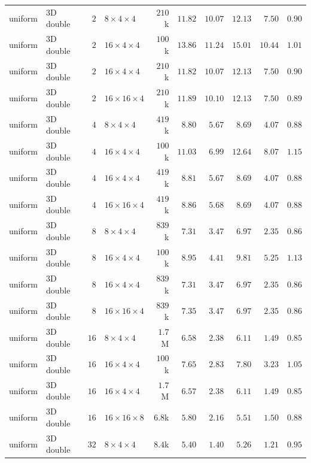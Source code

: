 {\begin{longtable}{llrlrrrrrr}
    uniform & 3D double & $2$ & $8{\times}4{\times}4$ & $210$k & $11.82$ & $10.07$ & $12.13$ & $7.50$ & $0.90$ \\
    uniform & 3D double & $2$ & $16{\times}4{\times}4$ & $100$k & $13.86$ & $11.24$ & $15.01$ & $10.44$ & $1.01$ \\
    uniform & 3D double & $2$ & $16{\times}4{\times}4$ & $210$k & $11.82$ & $10.07$ & $12.13$ & $7.50$ & $0.90$ \\
    uniform & 3D double & $2$ & $16{\times}16{\times}4$ & $210$k & $11.89$ & $10.10$ & $12.13$ & $7.50$ & $0.89$ \\
    uniform & 3D double & $4$ & $8{\times}4{\times}4$ & $419$k & $8.80$ & $5.67$ & $8.69$ & $4.07$ & $0.88$ \\
    uniform & 3D double & $4$ & $16{\times}4{\times}4$ & $100$k & $11.03$ & $6.99$ & $12.64$ & $8.07$ & $1.15$ \\
    uniform & 3D double & $4$ & $16{\times}4{\times}4$ & $419$k & $8.81$ & $5.67$ & $8.69$ & $4.07$ & $0.88$ \\
    uniform & 3D double & $4$ & $16{\times}16{\times}4$ & $419$k & $8.86$ & $5.68$ & $8.69$ & $4.07$ & $0.88$ \\
    uniform & 3D double & $8$ & $8{\times}4{\times}4$ & $839$k & $7.31$ & $3.47$ & $6.97$ & $2.35$ & $0.86$ \\
    uniform & 3D double & $8$ & $16{\times}4{\times}4$ & $100$k & $8.95$ & $4.41$ & $9.81$ & $5.25$ & $1.13$ \\
    uniform & 3D double & $8$ & $16{\times}4{\times}4$ & $839$k & $7.31$ & $3.47$ & $6.97$ & $2.35$ & $0.86$ \\
    uniform & 3D double & $8$ & $16{\times}16{\times}4$ & $839$k & $7.35$ & $3.47$ & $6.97$ & $2.35$ & $0.86$ \\
    uniform & 3D double & $16$ & $8{\times}4{\times}4$ & $1.7$M & $6.58$ & $2.38$ & $6.11$ & $1.49$ & $0.85$ \\
    uniform & 3D double & $16$ & $16{\times}4{\times}4$ & $100$k & $7.65$ & $2.83$ & $7.80$ & $3.23$ & $1.05$ \\
    uniform & 3D double & $16$ & $16{\times}4{\times}4$ & $1.7$M & $6.57$ & $2.38$ & $6.11$ & $1.49$ & $0.85$ \\
    uniform & 3D double & $16$ & $16{\times}16{\times}8$ & $6.8$k & $5.80$ & $2.16$ & $5.51$ & $1.50$ & $0.88$ \\
    uniform & 3D double & $32$ & $8{\times}4{\times}4$ & $8.4$k & $5.40$ & $1.40$ & $5.26$ & $1.21$ & $0.95$ \\

\end{longtable}}

